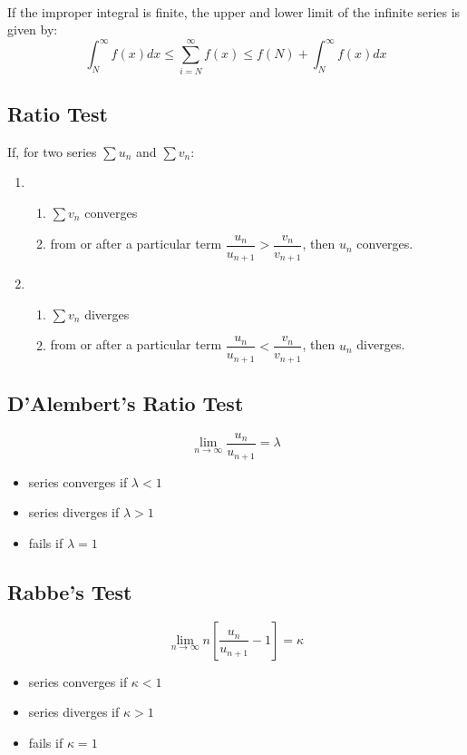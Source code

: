 \paragraph{}
If the improper integral is finite, the upper and lower limit of the infinite series is given by:
\begin{equation}
	\int_{N}^{\infty} f(x) dx \leq \sum_{i=N}^{\infty} f(x) \leq f(N)+\int_{N}^{\infty} f(x) dx
\end{equation}
\subsection{Ratio Test}
If, for two series $\sum u_n$ and $\sum v_n$:

\begin{enumerate}
	\item \begin{enumerate}
		\item $\sum v_n$ converges
		\item from or after a particular term $\dfrac{u_n}{u_{n+1}}>\dfrac{v_n}{v_{n+1}}$, then $u_n$ converges.
	\end{enumerate}
	\item \begin{enumerate}
		\item $\sum v_n$ diverges
		\item from or after a particular term $\dfrac{u_n}{u_{n+1}}<\dfrac{v_n}{v_{n+1}}$, then $u_n$ diverges.
	\end{enumerate}
\end{enumerate}

\subsection{D'Alembert's Ratio Test}
\begin{equation}
	\lim_{n\to\infty} \dfrac{u_n}{u_{n+1}}=\lambda
\end{equation}
\begin{itemize}
	\item series converges if $\lambda<1$
	\item series diverges if $\lambda>1$
	\item fails if $\lambda=1$
\end{itemize}

\subsection{Rabbe's Test}
\begin{equation}
	\lim_{n\to\infty} n[\dfrac{u_n}{u_{n+1}}-1]=\kappa
\end{equation}
\begin{itemize}
	\item series converges if $\kappa<1$
	\item series diverges if $\kappa>1$
	\item fails if $\kappa=1$
\end{itemize}


